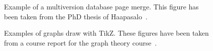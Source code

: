 \documentclass[12pt,a4paper,oneside,pdftex]{report}
\begin{document}


\begin{figure}[ht]
  \begin{center}
    
    \caption{Example of a multiversion database page merge. This figure has
    been taken from the PhD thesis of Haapasalo~\cite{HaapasaloThesis}.}
    \label{fig:page-merge}
  \end{center}
\end{figure}


\newlength{\graphdotsize}
\setlength{\graphdotsize}{1.7pt}
\newlength{\graphgridsize}
\setlength{\graphgridsize}{1.2em}
\begin{figure}[ht]
\begin{center}
\caption{Examples of graphs draw with TikZ. These figures have been taken from a
course report for the graph theory course~\cite{FerryProblem}.}
\label{fig:tikz-examples}
\end{center}
\end{figure}



% 







% 
\clearpage
{}
{}

\end{document}
